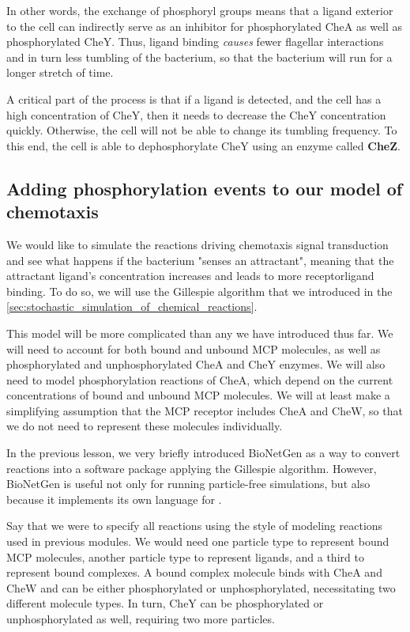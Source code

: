In other words, the exchange of phosphoryl groups means that a ligand exterior to the cell can indirectly serve as an inhibitor for phosphorylated CheA as well as phosphorylated CheY. Thus, ligand binding \textit{causes} fewer flagellar interactions and in turn less tumbling of the bacterium, so that the bacterium will run for a longer stretch of time.

A critical part of the process is that if a ligand is detected, and the cell has a high concentration of CheY, then it needs to decrease the CheY concentration quickly. Otherwise, the cell will not be able to change its tumbling frequency. To this end, the cell is able to dephosphorylate CheY using an enzyme called \textbf{CheZ}.


\FloatBarrier
{}
{}
\subsection{Adding phosphorylation events to our model of chemotaxis}


We would like to simulate the reactions driving chemotaxis signal transduction and see what happens if the bacterium "senses an attractant", meaning that the attractant ligand's concentration increases and leads to more receptor\-ligand binding. To do so, we will use the Gillespie algorithm that we introduced in the \autoref{sec:stochastic_simulation_of_chemical_reactions}.

This model will be more complicated than any we have introduced thus far. We will need to account for both bound and unbound MCP molecules, as well as phosphorylated and unphosphorylated CheA and CheY enzymes. We will also need to model phosphorylation reactions of CheA, which depend on the current concentrations of bound and unbound MCP molecules. We will at least make a simplifying assumption that the MCP receptor includes CheA and CheW, so that we do not need to represent these molecules individually.

In the previous lesson, we very briefly introduced BioNetGen as a way to convert reactions into a software package applying the Gillespie algorithm. However, BioNetGen is useful not only for running particle-free simulations, but also because it implements its own language for .

Say that we were to specify all reactions using the style of modeling reactions used in previous modules. We would need one particle type to represent bound MCP molecules, another particle type to represent ligands, and a third to represent bound complexes. A bound complex molecule binds with CheA and CheW and can be either phosphorylated or unphosphorylated, necessitating two different molecule types. In turn, CheY can be phosphorylated or unphosphorylated as well, requiring two more particles.

